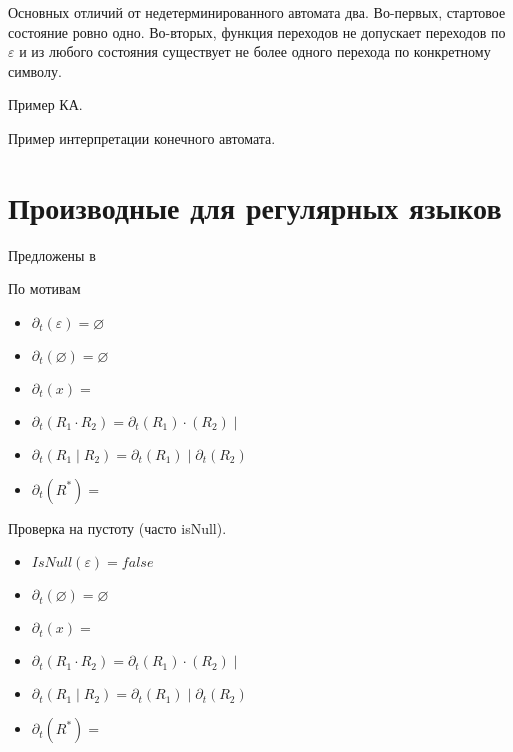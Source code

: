 Основных отличий от недетерминированного автомата два.
Во-первых, стартовое состояние ровно одно.
Во-вторых,  функция переходов не допускает переходов по $\varepsilon$ и из любого состояния существует не более одного перехода по конкретному символу.

\begin{example}
    Пример КА.

\end{example}

\begin{example}
    Пример интерпретации конечного автомата.
\end{example}

\section{Производные для регулярных языков}

Предложены в~

По мотивам~

\begin{itemize}
    \item $\partial_t(\varepsilon) = \varnothing$
    \item $\partial_t(\varnothing) = \varnothing$
    \item $\partial_t(x) = $
    \item $\partial_t(R_1 \cdot R_2) = \partial_t(R_1) \cdot (R_2) \mid $
    \item $\partial_t(R_1 \mid R_2) = \partial_t(R_1) \mid \partial_t(R_2) $
    \item $\partial_t(R^*) = $
\end{itemize}

Проверка на пустоту (часто isNull).

\begin{itemize}
    \item $IsNull(\varepsilon) = false$
    \item $\partial_t(\varnothing) = \varnothing$
    \item $\partial_t(x) = $
    \item $\partial_t(R_1 \cdot R_2) = \partial_t(R_1) \cdot (R_2) \mid $
    \item $\partial_t(R_1 \mid R_2) = \partial_t(R_1) \mid \partial_t(R_2) $
    \item $\partial_t(R^*) = $
\end{itemize}

